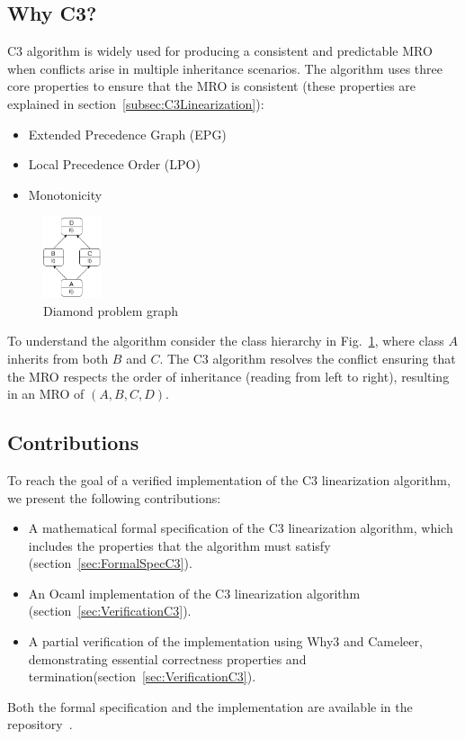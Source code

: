 \documentclass[runningheads]{llncs}
\begin{document}
\subsection{Why C3?}
C3 algorithm is widely used for producing a consistent and predictable MRO when conflicts arise in multiple inheritance scenarios.
The algorithm uses three core properties to ensure that the MRO is consistent (these properties are explained in section~\ref{subsec:C3Linearization}):
\begin{itemize}
    \item Extended Precedence Graph (EPG)
    \item Local Precedence Order (LPO)
    \item Monotonicity
\end{itemize}
\begin{figure}[htbp]
  \centering
  \includegraphics[width=0.15\textwidth]{images/DiamondProblem.png}
  \caption{Diamond problem graph}
  \label{fig:DiamondProblem}
\end{figure}
To understand the algorithm consider the class hierarchy in Fig.~\ref{fig:DiamondProblem}, where class $A$ inherits from both $B$ and $C$. The C3 algorithm resolves the conflict ensuring that the MRO respects the order of inheritance (reading from left to right), resulting in an MRO of $(A, B, C, D)$.

\subsection{Contributions}
To reach the goal of a verified implementation of the C3 linearization algorithm, we present the following contributions:
\begin{itemize}
    \item A mathematical formal specification of the C3 linearization algorithm, which includes the properties that the algorithm must satisfy (section~\ref{sec:FormalSpecC3}).
    \item An Ocaml implementation of the C3 linearization algorithm (section~\ref{sec:VerificationC3}).
    \item A partial verification of the implementation using Why3 and Cameleer, demonstrating essential correctness properties and termination(section~\ref{sec:VerificationC3}).
\end{itemize}
Both the formal specification and the implementation are available in the repository~\autocite{MiguelflorC3_ocaml_verified}.
\end{document}
